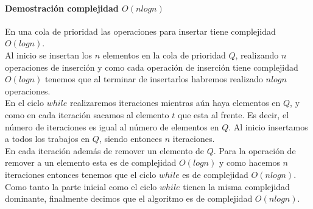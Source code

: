 \documentclass[12pt]{article}
\begin{document}
\paragraph{Demostración complejidad $O(nlogn)$}
En una cola de prioridad las operaciones para insertar tiene complejidad $O(logn)$.\\
Al inicio se insertan los $n$ elementos en la cola de prioridad $Q$, realizando $n$ operaciones de inserción y como cada operación de inserción tiene complejidad $O(logn)$ tenemos que al terminar de insertarlos habremos realizado $nlogn$ operaciones.\\
En el ciclo $while$ realizaremos iteraciones mientras aún haya elementos en $Q$, y como en cada iteración sacamos al elemento $t$ que esta al frente. Es decir, el número de iteraciones es igual al número de elementos en $Q$. Al inicio insertamos a todos los trabajos en $Q$, siendo entonces $n$ iteraciones.\\
En cada iteración además de remover un elemento de $Q$. Para la operación de remover a un elemento esta es de complejidad $O(logn)$ y como hacemos $n$ iteraciones entonces tenemos que el ciclo $while$ es de complejidad $O(nlogn)$. \\
Como tanto la parte inicial como el ciclo $while$ tienen la misma complejidad dominante, finalmente decimos que el algoritmo es de complejidad $O(nlogn)$.\\
\end{document}
